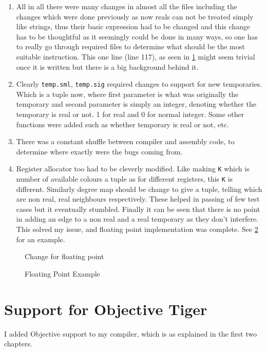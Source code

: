 \begin{enumerate}
	\item All in all there were many changes in almost all the files including the changes which were done previously as now reals can not be treated simply like strings, thus their basic expression had to be changed and this change has to be thoughtful as it seemingly could be done in many ways, so one has to really go through required files to determine what should be the most suitable instruction. This one line (line 117), as seen in \ref{fig:ft1} might seem trivial once it is written but there is a big background behind it.
	\item Clearly \texttt{temp.sml}, \texttt{temp.sig} required changes to support for new temporaries. Which is a tuple now, where first parameter is what was originally the temporary and second parameter is simply an integer, denoting whether the temporary is real or not. 1 for real and 0 for normal integer. Some other functions were added such as whether temporary is real or not, etc.
	\item There was a constant shuffle between compiler and assembly code, to determine where exactly were the bugs coming from.
	\item Register allocator too had to be cleverly modified. Like making \texttt{K} which is number of available colours a tuple as for different registers, this \texttt{K} is different. Similarly degree map should be change to give a tuple, telling which are non real, real neighbours respectively. These helped in passing of few test cases but it eventually stumbled. Finally it can be seen that there is no point in adding an edge to a non real and a real temporary as they don't interfere. This solved my issue, and floating point implementation was complete. See \ref{fig:ft2} for an example.
\end{enumerate}

\begin{figure}
	\centering
	\caption{Change for floating point}
	\label{fig:ft1}
\end{figure}


\begin{figure}
	\centering
	\caption{Floating Point Example}
	\label{fig:ft2}
\end{figure}

\section{Support for Objective Tiger}

I added Objective support to my compiler, which is as explained in the first two chapters.